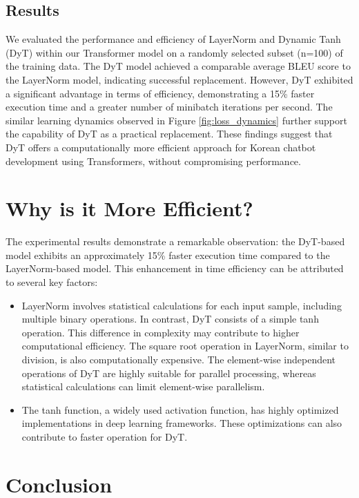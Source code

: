 \documentclass{article}
\begin{document}
\subsection{Results}
We evaluated the performance and efficiency of LayerNorm and Dynamic Tanh (DyT) within our Transformer model on a randomly selected subset (n=100) of the training data. The DyT model achieved a comparable average BLEU score to the LayerNorm model, indicating successful replacement. However, DyT exhibited a significant advantage in terms of efficiency, demonstrating a 15\% faster execution time and a greater number of minibatch iterations per second. The similar learning dynamics observed in Figure \ref{fig:loss_dynamics} further support the capability of DyT as a practical replacement. These findings suggest that DyT offers a computationally more efficient approach for Korean chatbot development using Transformers, without compromising performance.

\section{Why is it More Efficient?}

The experimental results demonstrate a remarkable observation: the DyT-based model exhibits an approximately 15\% faster execution time compared to the LayerNorm-based model. This enhancement in time efficiency can be attributed to several key factors:

\begin{itemize}
    \item LayerNorm involves statistical calculations for each input sample, including multiple binary operations. In contrast, DyT consists of a simple tanh operation. This difference in complexity may contribute to higher computational efficiency. The square root operation in LayerNorm, similar to division, is also computationally expensive. The element-wise independent operations of DyT are highly suitable for parallel processing, whereas statistical calculations can limit element-wise parallelism.
    \item The tanh function, a widely used activation function, has highly optimized implementations in deep learning frameworks. These optimizations can also contribute to faster operation for DyT.
\end{itemize}

\section{Conclusion}
\end{document}
